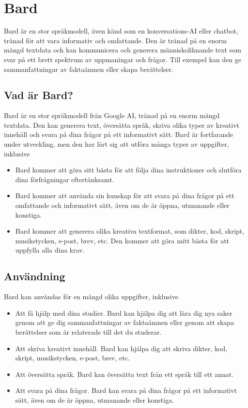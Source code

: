 \hypertarget{bard}{%
\section{Bard}\label{bard}}

Bard är en stor språkmodell, även känd som en konversations-AI eller
chatbot, tränad för att vara informativ och omfattande. Den är tränad på
en enorm mängd textdata och kan kommunicera och generera
människoliknande text som svar på ett brett spektrum av uppmaningar och
frågor. Till exempel kan den ge sammanfattningar av faktaämnen eller
skapa berättelser.

\hypertarget{vad-uxe4r-bard}{%
\subsection{Vad är Bard?}\label{vad-uxe4r-bard}}

Bard är en stor språkmodell från Google AI, tränad på en enorm mängd
textdata. Den kan generera text, översätta språk, skriva olika typer av
kreativt innehåll och svara på dina frågor på ett informativt sätt. Bard
är fortfarande under utveckling, men den har lärt sig att utföra många
typer av uppgifter, inklusive

\begin{itemize}
\tightlist
\item
  Bard kommer att göra sitt bästa för att följa dina instruktioner och
  slutföra dina förfrågningar eftertänksamt.
\item
  Bard kommer att använda sin kunskap för att svara på dina frågor på
  ett omfattande och informativt sätt, även om de är öppna, utmanande
  eller konstiga.
\item
  Bard kommer att generera olika kreativa textformat, som dikter, kod,
  skript, musikstycken, e-post, brev, etc. Den kommer att göra mitt
  bästa för att uppfylla alla dina krav.
\end{itemize}

\hypertarget{anvuxe4ndning}{%
\subsection{Användning}\label{anvuxe4ndning}}

Bard kan användas för en mängd olika uppgifter, inklusive

\begin{itemize}
\tightlist
\item
  Att få hjälp med dina studier. Bard kan hjälpa dig att lära dig nya
  saker genom att ge dig sammanfattningar av faktaämnen eller genom att
  skapa berättelser som är relaterade till det du studerar.
\item
  Att skriva kreativt innehåll. Bard kan hjälpa dig att skriva dikter,
  kod, skript, musikstycken, e-post, brev, etc.
\item
  Att översätta språk. Bard kan översätta text från ett språk till ett
  annat.
\item
  Att svara på dina frågor. Bard kan svara på dina frågor på ett
  informativt sätt, även om de är öppna, utmanande eller konstiga.
\end{itemize}

